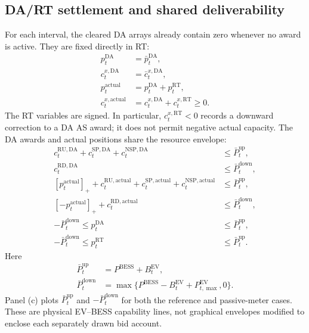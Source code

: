 \documentclass[final,5p,times]{elsarticle}
\newcommand{\EV}{\mathrm{EV}}
\newcommand{\BESS}{\mathrm{BESS}}
\newcommand{\DA}{\mathrm{DA}}
\newcommand{\RT}{\mathrm{RT}}
\newcommand{\RU}{\mathrm{RU}}
\newcommand{\RD}{\mathrm{RD}}
\newcommand{\SP}{\mathrm{SP}}
\newcommand{\NSP}{\mathrm{NSP}}
\newcommand{\actual}{\mathrm{actual}}
\newcommand{\pos}[1]{\left[#1\right]_{+}}
\begin{document}
\subsection{DA/RT settlement and shared deliverability}
For each interval, the cleared DA arrays already contain zero whenever no award
is active. They are fixed directly in RT:
\begin{align}
p_t^{\DA}&=\bar p_t^{\DA}, \label{eq:app_fixed_da_energy}\\
c_t^{x,\DA}&=\bar c_t^{x,\DA}, \label{eq:app_fixed_da_as}\\
p_t^{\actual}&=p_t^{\DA}+p_t^{\RT}, \label{eq:app_actual_energy}\\
c_t^{x,\actual}&=c_t^{x,\DA}+c_t^{x,\RT}\ge0. \label{eq:app_actual_as}
\end{align}
The RT variables are signed. In particular, $c_t^{x,\RT}<0$ records a
downward correction to a DA AS award; it does not permit negative actual
capacity. The DA awards and actual positions share the resource envelope:
\begin{align}
c_t^{\RU,\DA}+c_t^{\SP,\DA}+c_t^{\NSP,\DA}
&\le\bar P_t^{\mathrm{up}}, \label{eq:app_da_up_capacity}\\
c_t^{\RD,\DA}&\le\bar P_t^{\mathrm{down}}, \label{eq:app_da_down_capacity}\\
\pos{p_t^{\actual}}+c_t^{\RU,\actual}+c_t^{\SP,\actual}+c_t^{\NSP,\actual}
&\le\bar P_t^{\mathrm{up}}, \label{eq:app_actual_up_capacity}\\
\pos{-p_t^{\actual}}+c_t^{\RD,\actual}
&\le\bar P_t^{\mathrm{down}}, \label{eq:app_actual_down_capacity}\\
-\bar P_t^{\mathrm{down}}\le p_t^{\DA}
&\le\bar P_t^{\mathrm{up}}, \label{eq:app_da_energy_bounds}\\
-\bar P_t^{\mathrm{down}}\le p_t^{\RT}
&\le\bar P_t^{\mathrm{up}}. \label{eq:app_rt_energy_bounds}
\end{align}
Here
\begin{align}
\bar P_t^{\mathrm{up}}&=P^{\BESS}+B_t^{\EV},\\
\bar P_t^{\mathrm{down}}&=\max\{P^{\BESS}-B_t^{\EV}+P_{t,\max}^{\EV},0\}.
\end{align}
Panel (c) plots $\bar P_t^{\mathrm{up}}$ and
$-\bar P_t^{\mathrm{down}}$ for both the reference and passive-meter cases.
These are physical EV--BESS capability lines, not graphical envelopes modified
to enclose each separately drawn bid account.
\end{document}
